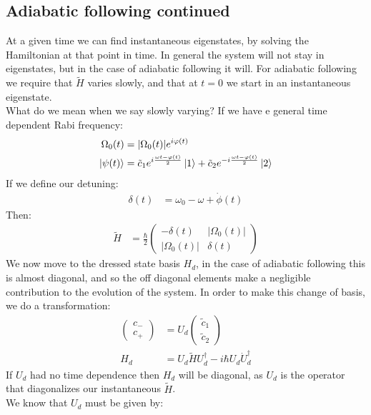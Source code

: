 \subsection{Adiabatic following continued}
At a given time we can find instantaneous eigenstates, by solving the Hamiltonian at that point in time. In general the system will not stay in eigenstates, but in the case of adiabatic following it will. For adiabatic following we require that $\tilde{H}$ varies slowly, and that at $t=0$ we start in an instantaneous eigenstate. \\
What do we mean when we say slowly varying? If we have e general time dependent Rabi frequency:
\begin{align*}
	\Omega_0(t) &= |\Omega_0(t)| e^{i\varphi(t)} \\
	\ket{\psi(t)} &= \tilde{c}_1 e^{i\frac{\omega t - \varphi(t)}{2}} \ket{1} + \tilde{c}_2 e^{-i \frac{\omega t - \varphi(t)}{2}} \ket{2}
\end{align*}
If we define our detuning:
\begin{align*}
	\delta(t) &= \omega_0 - \omega + \dot{\phi}(t)
\end{align*}
Then:
\begin{align*}
	\tilde{H} &= \frac{\hbar}{2} \begin{pmatrix}
		-\delta(t) & |\Omega_0(t)| \\
		|\Omega_0(t)| & \delta(t)
			      \end{pmatrix}
\end{align*}
We now move to the dressed state basis $H_d$, in the case of adiabatic following this is almost diagonal, and so the off diagonal elements make a negligible contribution to the evolution of the system. In order to make this change of basis, we do a transformation:
\begin{align*}
	\begin{pmatrix}
		c_- \\
		c_+
	\end{pmatrix} &= U_d \begin{pmatrix}
		\tilde{c}_1 \\
		\tilde{c}_2
		    \end{pmatrix} \\
	H_d &= U_d\tilde{H}U_d^\dagger - i\hbar U_d\dot{U}_d^\dagger
\end{align*}
If $U_d$ had no time dependence then $H_d$ will be diagonal, as $U_d$ is the operator that diagonalizes our instantaneous $\tilde{H}$. \\
We know that $U_d$ must be given by:
